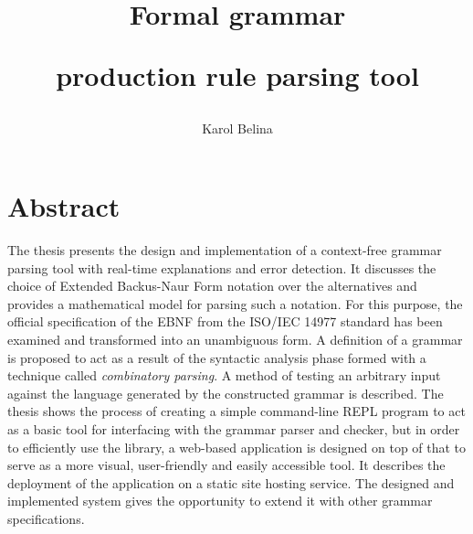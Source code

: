\documentclass[english,engineering]{wizthesis}
\author{Karol Belina}
\title{Formal grammar\par production rule parsing tool}
\begin{document}
\frontmatter %

\maketitle

\chapter*{Abstract}

The thesis presents the design and implementation of a context-free grammar
parsing tool with real-time explanations and error detection. It discusses the
choice of Extended Backus-Naur Form notation over the alternatives and provides
a mathematical model for parsing such a notation. For this purpose, the official
specification of the EBNF from the ISO/IEC 14977 standard has been examined and
transformed into an unambiguous form. A definition of a grammar is proposed to
act as a result of the syntactic analysis phase formed with a technique called
\emph{combinatory parsing}. A method of testing an arbitrary input against the
language generated by the constructed grammar is described. The thesis shows the
process of creating a simple command-line REPL program to act as a basic tool
for interfacing with the grammar parser and checker, but in order to efficiently
use the library, a web-based application is designed on top of that to serve as
a more visual, user-friendly and easily accessible tool. It describes the
deployment of the application on a static site hosting service. The designed and
implemented system gives the opportunity to extend it with other grammar
specifications.
\end{document}

